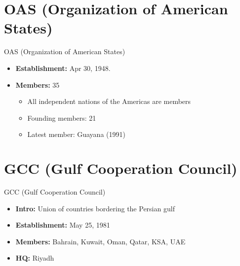 \documentclass[
  12pt,
  ignorenonframetext,
  progressbar=frametitle]{beamer}
\providecommand{\tightlist}{%
  \setlength{\itemsep}{0pt}\setlength{\parskip}{0pt}}
\begin{document}
\section{OAS (Organization of American States)}
\begin{frame}[allowframebreaks]
{OAS (Organization of American States)}
\protect\hypertarget{oas-organization-of-american-states}{}
\begin{itemize}
\tightlist
\item
  \textbf{Establishment:} Apr 30, 1948.
\item
  \textbf{Members:} 35

  \begin{itemize}
  \tightlist
  \item
    All independent nations of the Americas are members
  \item
    Founding members: 21
  \item
    Latest member: Guayana (1991)
  \end{itemize}
\end{itemize}
\end{frame}

\section{GCC (Gulf Cooperation Council)}
\begin{frame}[allowframebreaks]
{GCC (Gulf Cooperation Council)}
\protect\hypertarget{gcc-gulf-cooperation-council}{}
\begin{itemize}
\tightlist
\item
  \textbf{Intro:} Union of countries bordering the Persian gulf
\item
  \textbf{Establishment:} May 25, 1981
\item
  \textbf{Members:} Bahrain, Kuwait, Oman, Qatar, KSA, UAE
\item
  \textbf{HQ:} Riyadh
\end{itemize}
\end{frame}
\end{document}
